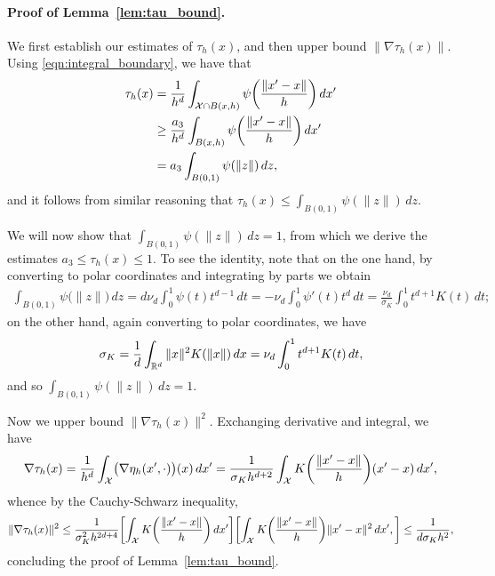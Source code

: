 \paragraph{Proof of Lemma~\ref{lem:tau_bound}.}
We first establish our estimates of $\tau_h(x)$, and then upper bound $\|\nabla\tau_h(x)\|$. Using \eqref{eqn:integral_boundary}, we have that
\begin{align*}
\tau_h(x) & = \frac{1}{h^d} \int_{\mathcal{X} \cap B(x,h)} \psi\biggl(\frac{\|x' - x\|}{h}\biggr) \,dx' \\
& \geq \frac{a_3}{h^d} \int_{B(x,h)} \psi\biggl(\frac{\|x' - x\|}{h}\biggr) \,dx' \\
& = a_3\int_{B(0,1)} \psi(\|z\|) \,dz,
\end{align*}
and it follows from similar reasoning that $\tau_h(x) \leq \int_{B(0,1)} \psi(\|z\|) \,dz$. 

We will now show that $\int_{B(0,1)} \psi(\|z\|) \,dz = 1$, from which we derive the estimates $a_3 \leq \tau_h(x) \leq 1$. To see the identity, note that on the one hand, by converting to polar coordinates and integrating by parts we obtain
\begin{align*}
\int_{B(0,1)} \psi\bigl(\|z\|\bigr) \,dz = d \nu_d \int_{0}^{1} \psi(t) t^{d - 1} \,dt = -\nu_d \int_{0}^{1} \psi'(t) t^{d} \,dt = \frac{\nu_d}{\sigma_K} \int_{0}^{1} t^{d + 1} K(t) \,dt;
\end{align*}
on the other hand, again converting to polar coordinates, we have
\begin{equation*}
\sigma_K = \frac{1}{d} \int_{\mathbb{R}^d} \|x\|^2 K(\|x\|) \,dx = \nu_d \int_{0}^{1}t^{d + 1} K(t) \,dt,
\end{equation*}
and so $\int_{B(0,1)} \psi(\|z\|) \,dz = 1$.

Now we upper bound $\|\nabla\tau_h(x)\|^2$. Exchanging derivative and integral, we have
\begin{align*}
\nabla\tau_h(x) = \frac{1}{h^d} \int_{\mathcal{X}} \bigl(\nabla \eta_h(x',\cdot)\bigr)(x) \,dx' = \frac{1}{\sigma_K h^{d + 2}} \int_{\mathcal{X}} K\biggl(\frac{\|x' - x\|}{h}\biggr)(x' - x)\,dx',
\end{align*}
whence by the Cauchy-Schwarz inequality,
\begin{equation*}
\|\nabla\tau_h(x)\|^2 \leq \frac{1}{\sigma_K^2 h^{2d + 4}} \biggl[\int_{\mathcal{X}} K\biggl(\frac{\|x' - x\|}{h}\biggr)\,dx'\biggr] \biggl[\int_{\mathcal{X}} K\biggl(\frac{\|x' - x\|}{h}\biggr)\|x' - x\|^2\,dx',\biggr] \leq \frac{1}{d\sigma_K h^{2}},
\end{equation*}
concluding the proof of Lemma~\ref{lem:tau_bound}. 

